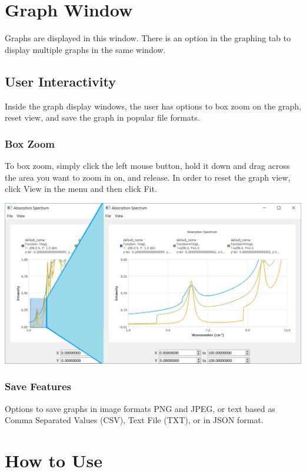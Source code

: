 \documentclass[12pt]{article}
\begin{document}
\section{Graph Window}
Graphs are displayed in this window. There is an option in the graphing tab to display multiple graphs in the same window.
\subsection{User Interactivity}
Inside the graph display windows, the user has options to box zoom on the graph, reset view, and save the graph in popular file formats. 
\subsubsection{Box Zoom}
To box zoom, simply click the left mouse button, hold it down and drag across the area you want to zoom in on, and release. In order to reset the graph view, click View in the menu and then click Fit.
\begin{center}
\includegraphics[scale = 0.5]{GraphDemo}
\end{center}
\subsubsection{Save Features}
Options to save graphs in image formats PNG and JPEG, or  text based as Comma Separated Values (CSV), Text File (TXT), or in JSON format.
\newpage
\section{How to Use}
\end{document}
